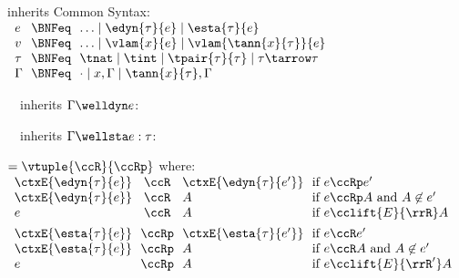 \begin{flushleft}

 inherits Common Syntax:\\
$\begin{array}{l@{~~}c@{~~}l}
  e & \BNFeq & \ldots \mid \edyn{\tau}{e} \mid \esta{\tau}{e}
\\
  v & \BNFeq & \ldots \mid \vlam{x}{e} \mid \vlam{\tann{x}{\tau}}{e}
\\
  \tau & \BNFeq & \tnat \mid \tint \mid \tpair{\tau}{\tau} \mid \tau \tarrow \tau
\\
  \Gamma & \BNFeq & \cdot \mid x,\Gamma \mid \tann{x}{\tau},\Gamma
\end{array}$

\smallskip
\begin{minipage}[t]{0.5\columnwidth}
~~inherits $\Gamma \welldyn e$:\\
\begin{mathpar}
\end{mathpar}
\end{minipage}%
\begin{minipage}[t]{0.5\columnwidth}
~~inherits $\Gamma \wellsta e : \tau$:\\
\begin{mathpar}

\end{mathpar}
\end{minipage}

\smallskip
{} $= \vtuple{\ccR}{\ccRp}$ where:\\
$\begin{array}{l@{~~}c@{~~}l@{~~}l}
\ctxE{\edyn{\tau}{e}} & \ccR & \ctxE{\edyn{\tau}{e'}}
  & \mbox{if $e \ccRp e'$}
\\
\ctxE{\edyn{\tau}{e}} & \ccR & A
  & \mbox{if $e \ccRp A$ and $A \not\in e'$}
\\
e & \ccR & A
  & \mbox{if $e \cclift{E}{\rrR} A$}
\\[1ex]
\ctxE{\esta{\tau}{e}} & \ccRp & \ctxE{\esta{\tau}{e'}}
 & \mbox{if $e \ccR e'$}
\\
\ctxE{\esta{\tau}{e}} & \ccRp & A
 & \mbox{if $e \ccR A$ and $A \not\in e'$}
\\
e & \ccRp & A
 & \mbox{if $e \cclift{E}{\rrR'} A$}
\end{array}$

\end{flushleft}
